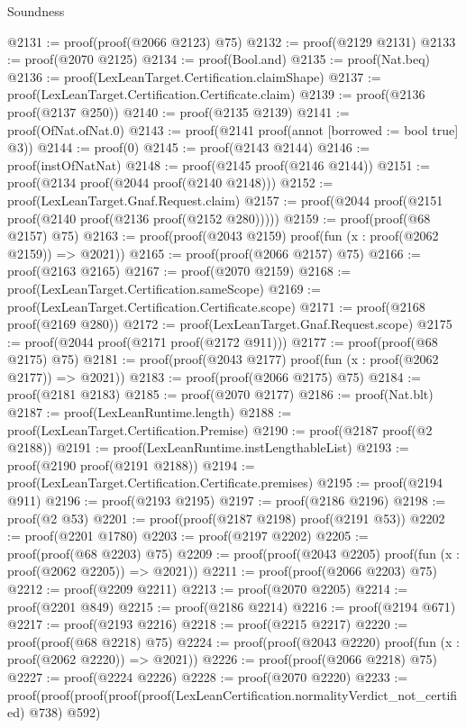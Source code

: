 \begin{lexlean}{Soundness}
\begin{coremodule}
@2131 := proof(proof(@2066 @2123) @75)
@2132 := proof(@2129 @2131)
@2133 := proof(@2070 @2125)
@2134 := proof(Bool.and)
@2135 := proof(Nat.beq)
@2136 := proof(LexLeanTarget.Certification.claimShape)
@2137 := proof(LexLeanTarget.Certification.Certificate.claim)
@2139 := proof(@2136 proof(@2137 @250))
@2140 := proof(@2135 @2139)
@2141 := proof(OfNat.ofNat.{0})
@2143 := proof(@2141 proof(annot [borrowed := bool true] @3))
@2144 := proof(0)
@2145 := proof(@2143 @2144)
@2146 := proof(instOfNatNat)
@2148 := proof(@2145 proof(@2146 @2144))
@2151 := proof(@2134 proof(@2044 proof(@2140 @2148)))
@2152 := proof(LexLeanTarget.Gnaf.Request.claim)
@2157 := proof(@2044 proof(@2151 proof(@2140 proof(@2136 proof(@2152 @280)))))
@2159 := proof(proof(@68 @2157) @75)
@2163 := proof(proof(@2043 @2159) proof(fun (x : proof(@2062 @2159)) => @2021))
@2165 := proof(proof(@2066 @2157) @75)
@2166 := proof(@2163 @2165)
@2167 := proof(@2070 @2159)
@2168 := proof(LexLeanTarget.Certification.sameScope)
@2169 := proof(LexLeanTarget.Certification.Certificate.scope)
@2171 := proof(@2168 proof(@2169 @280))
@2172 := proof(LexLeanTarget.Gnaf.Request.scope)
@2175 := proof(@2044 proof(@2171 proof(@2172 @911)))
@2177 := proof(proof(@68 @2175) @75)
@2181 := proof(proof(@2043 @2177) proof(fun (x : proof(@2062 @2177)) => @2021))
@2183 := proof(proof(@2066 @2175) @75)
@2184 := proof(@2181 @2183)
@2185 := proof(@2070 @2177)
@2186 := proof(Nat.blt)
@2187 := proof(LexLeanRuntime.length)
@2188 := proof(LexLeanTarget.Certification.Premise)
@2190 := proof(@2187 proof(@2 @2188))
@2191 := proof(LexLeanRuntime.instLengthableList)
@2193 := proof(@2190 proof(@2191 @2188))
@2194 := proof(LexLeanTarget.Certification.Certificate.premises)
@2195 := proof(@2194 @911)
@2196 := proof(@2193 @2195)
@2197 := proof(@2186 @2196)
@2198 := proof(@2 @53)
@2201 := proof(proof(@2187 @2198) proof(@2191 @53))
@2202 := proof(@2201 @1780)
@2203 := proof(@2197 @2202)
@2205 := proof(proof(@68 @2203) @75)
@2209 := proof(proof(@2043 @2205) proof(fun (x : proof(@2062 @2205)) => @2021))
@2211 := proof(proof(@2066 @2203) @75)
@2212 := proof(@2209 @2211)
@2213 := proof(@2070 @2205)
@2214 := proof(@2201 @849)
@2215 := proof(@2186 @2214)
@2216 := proof(@2194 @671)
@2217 := proof(@2193 @2216)
@2218 := proof(@2215 @2217)
@2220 := proof(proof(@68 @2218) @75)
@2224 := proof(proof(@2043 @2220) proof(fun (x : proof(@2062 @2220)) => @2021))
@2226 := proof(proof(@2066 @2218) @75)
@2227 := proof(@2224 @2226)
@2228 := proof(@2070 @2220)
@2233 := proof(proof(proof(proof(proof(LexLeanCertification.normalityVerdict_not_certified) @738)
          @592)

\end{coremodule}
\end{lexlean}

